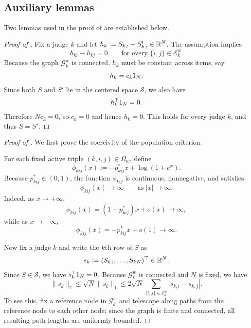 \documentclass{article}
\begin{document}
\begin{bibunit}[unsrtnat]
\subsection{Auxiliary lemmas} \label{app:lemmas}
Two lemmas used in the proof of  are established below.


\begin{proof}[Proof of ]
Fix a judge $k$ and let $h_k:=S_{k,:}-S'_{k,:}\in\mathbb{R}^N$. The assumption implies
\[
h_{ki}-h_{kj}=0
\qquad\text{for every }\{i,j\}\in\mathcal E_k^w.
\]
Because the graph $\mathcal G_k^w$ is connected, $h_k$ must be constant across items, say
\[
h_k=c_k1_N.
\]
Since both $S$ and $S'$ lie in the centered space $\mathcal S$, we also have
\[
h_k^\top1_N=0.
\]
Therefore $Nc_k=0$, so $c_k=0$ and hence $h_k=0$. This holds for every judge $k$, and thus $S=S'$.
\end{proof}


\begin{proof}[Proof of ]
We first prove the coercivity of the population criterion.

For each fixed active triple $(k,i,j)\in\Omega_w$, define
\[
\phi_{kij}(x):=-p_{kij}^\ast x+\log(1+e^x).
\]
Because $p_{kij}^\ast\in(0,1)$, the function $\phi_{kij}$ is continuous, nonnegative, and satisfies
\[
\phi_{kij}(x)\to\infty
\qquad\text{as }|x|\to\infty.
\]
Indeed, as $x\to+\infty$,
\[
\phi_{kij}(x)=(1-p_{kij}^\ast)x+o(x)\to\infty,
\]
while as $x\to-\infty$,
\[
\phi_{kij}(x)=-p_{kij}^\ast x+o(1)\to\infty.
\]

Now fix a judge $k$ and write the $k$th row of $S$ as
\[
s_k:=(S_{k1},\dots,S_{kN})^\top\in\mathbb{R}^N.
\]
Since $S\in\mathcal S$, we have $s_k^\top1_N=0$. Because $\mathcal G_k^w$ is connected and $N$ is fixed, we have
\begin{equation}\label{eq:row-graph-bound}
\|s_k\|_2
\le \sqrt{N}\|s_k\|_1 \le
2\sqrt{N}\sum_{\{i,j\}\in\mathcal E_k^w}|s_{k,i}-s_{k,j}|.
\end{equation}
To see this, fix a reference node in $\mathcal G_k^w$ and telescope along paths from the reference node to each other node; since the graph is finite and connected, all resulting path lengths are uniformly bounded.


\end{proof}
\end{bibunit}
\end{document}
